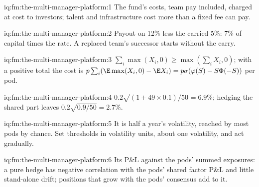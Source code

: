 \begin{solution}{iq:fm:the-multi-manager-platform:1}
The fund's costs, team pay included, charged at cost to investors; talent and infrastructure cost more than a fixed fee can pay.
\end{solution}

\begin{solution}{iq:fm:the-multi-manager-platform:2}
Payout on 12\% less the carried 5\%: 7\% of capital times the rate. A replaced team's successor starts without the carry.
\end{solution}

\begin{solution}{iq:fm:the-multi-manager-platform:3}
$\sum_i\max(X_i,0)\ge\max(\sum_i X_i,0)$; with a positive total the cost is $p\sum_i(\E\max(X_i,0)-\E X_i)=p\sigma(\varphi(S)-S\Phi(-S))$ per pod.
\end{solution}

\begin{solution}{iq:fm:the-multi-manager-platform:4}
$0.2\sqrt{(1+49\times0.1)/50}=6.9\%$; hedging the shared part leaves $0.2\sqrt{0.9/50}=2.7\%$.
\end{solution}

\begin{solution}{iq:fm:the-multi-manager-platform:5}
It is half a year's volatility, reached by most pods by chance. Set thresholds in volatility units, about one volatility, and act gradually.
\end{solution}

\begin{solution}{iq:fm:the-multi-manager-platform:6}
Its P\&L against the pods' summed exposures: a pure hedge has negative correlation with the pods' shared factor P\&L and little stand-alone
drift; positions that grow with the pods' consensus add to it.
\end{solution}
